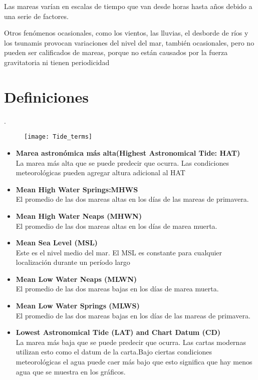 \documentclass[12pt]{article}
\begin{document}
Las mareas varían en escalas de tiempo que van desde horas hasta años debido a una serie de factores.


Otros fenómenos ocasionales, como los vientos, las lluvias, el desborde de ríos y los tsunamis provocan variaciones del nivel del mar, también ocasionales, pero no pueden ser calificados de mareas, porque no están causados por la fuerza gravitatoria ni tienen periodicidad

\section*{Definiciones}
.
\begin{figure}[ht]
\texttt{[image: Tide\_terms]}
\centering

\end{figure}

\begin{itemize}
\item\textbf{Marea astronómica más alta(Highest Astronomical Tide: HAT)}\\
La marea más alta que se puede predecir que ocurra. Las condiciones meteorológicas pueden agregar altura adicional al HAT

\item\textbf{ Mean High Water Springs:MHWS} \\
El promedio de las dos mareas altas en los días de las mareas de primavera.

\item\textbf{ Mean High Water Neaps (MHWN)}\\
El promedio de las dos mareas altas en los días de marea muerta.

\item \textbf{Mean Sea Level (MSL)} \\
Este es el nivel medio del mar. El MSL es constante para cualquier localización durante un período largo

\item \textbf{Mean Low Water Neaps (MLWN)} \\
El promedio de las dos mareas bajas en los días de marea muerta.

\item \textbf{Mean Low Water Springs (MLWS)} \\
El promedio de las dos mareas bajas en los días de las mareas de primavera.


\item\textbf{ Lowest Astronomical Tide (LAT) and Chart Datum (CD)} \\
La marea más baja que se puede predecir que ocurra. Las cartas modernas utilizan esto como el datum de la carta.Bajo ciertas condiciones meteorológicas el agua puede caer más bajo que esto significa que hay menos agua que se muestra en los gráficos.

\end{itemize}
\end{document}
